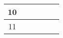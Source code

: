 \begin{table}[ht]
{\begin{tabular}{|c|l|l|l|c|c|}
	10                                &                                                                                                                                                                                              &                                                                                                                                      &                                                                                                                                                                                                                 &                                                                                                      &                                                                                                       \\ \hline
	11                                &                                                                                                                                                                                              &                                                                                                                                      &                                                                                                                                                                                                                 &                                                                                                      &                                                                                                       \\ \hline
\end{tabular}}
\end{table}
